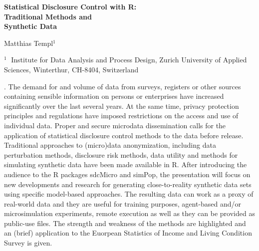 \documentclass[12pt]{article}
\begin{document}
\begin{flushleft}


{\LARGE\bf Statistical Disclosure Control with R: \\
 Traditional Methods and \\ \vspace{0.2cm} Synthetic Data}


\vspace{1.0cm}

Matthias Templ$^1$ 

\begin{description}

\item $^1 \;$ Institute for Data Analysis and Process Design, 
Zurich University of Applied Sciences, Winterthur, CH-8404, Switzerland


\end{description}

\end{flushleft}


\vspace{0.75cm}

. The demand for and volume of data from surveys, registers or other sources containing sensible information on persons or enterprises have increased significantly over the last several years. At the same time, privacy protection principles and regulations have imposed restrictions on the access and use of individual data. Proper and secure microdata dissemination calls for the application of statistical disclosure control methods to the data before release.
Traditional approaches to (micro)data anonymization, including data perturbation methods, disclosure risk methods, data utility and methods for simulating synthetic data have been made available in R. After introducing the audience to the R packages sdcMicro and simPop, the presentation will focus on new developments and research for generating close-to-reality synthetic data sets using specific model-based approaches. The resulting data can work as a proxy of real-world data and they are useful for training purposes, agent-based and/or microsimulation experiments, remote execution as well as they can be provided as public-use files. The strength and weakness of the methods are highlighted and an (brief) application to the Euorpean Statistics of Income and Living Condition Survey is given. 
\end{document}
